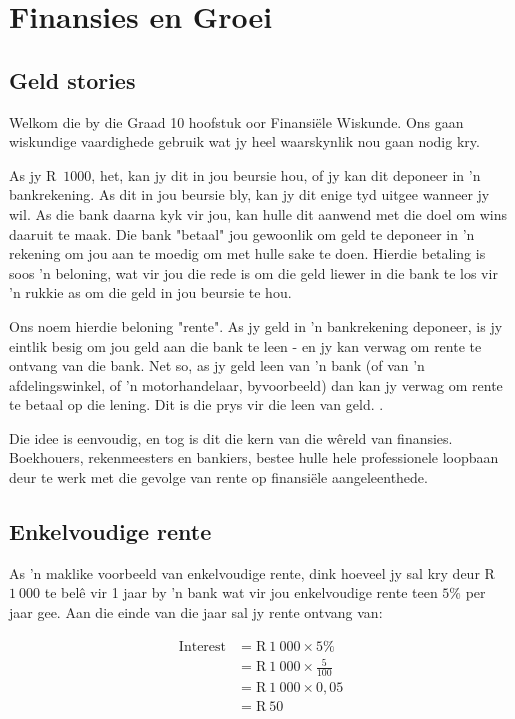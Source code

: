 \chapter{Finansies en Groei}

\section{Geld stories}

Welkom die by die Graad 10 hoofstuk oor Finansiële Wiskunde. Ons gaan wiskundige vaardighede gebruik wat
jy heel waarskynlik nou gaan nodig kry.\par

As jy R~$1 000$, het, kan jy dit in jou beursie hou, of jy kan dit deponeer in ’n bankrekening. As dit in jou beursie bly,
kan jy dit enige tyd uitgee wanneer jy wil. As die bank daarna kyk vir jou, kan hulle dit aanwend met die doel om
wins daaruit te maak. Die bank "betaal" jou gewoonlik om geld te deponeer in ’n rekening om jou aan te moedig
om met hulle sake te doen. Hierdie betaling is soos ’n beloning, wat vir jou die rede is om die geld liewer in die
bank te los vir ’n rukkie as om die geld in jou beursie te hou.\par Ons noem hierdie beloning "rente".
As jy geld in ’n bankrekening deponeer, is jy eintlik besig om jou geld aan die bank te leen - en jy kan verwag om
rente te ontvang van die bank. Net so, as jy geld leen van ’n bank (of van ’n afdelingswinkel, of ’n motorhandelaar,
byvoorbeeld) dan kan jy verwag om rente te betaal op die lening. Dit is die prys vir die leen van geld.
.\par

Die idee is eenvoudig, en tog is dit die kern van die w\^{e}reld van finansies. Boekhouers, rekenmeesters en
bankiers, bestee hulle hele professionele loopbaan deur te werk met die gevolge van rente op
finansiële aangeleenthede.\par

\section{Enkelvoudige rente}
  
As ’n maklike voorbeeld van enkelvoudige rente, dink hoeveel jy sal kry deur R~$1~000$ te belê vir 1 jaar by ’n bank
wat vir jou enkelvoudige rente teen $5\%$ per jaar gee. Aan die einde van die jaar sal jy rente ontvang van:\par
\begin{align*}
    \mathrm{Interest} &= \text{R}~1~000 \times 5\%\\
    &= \text{R}~1~000 \times \frac{5}{100}\\
    &= \text{R}~1~000 \times 0,05\\
    &= \text{R}~50
\end{align*}

